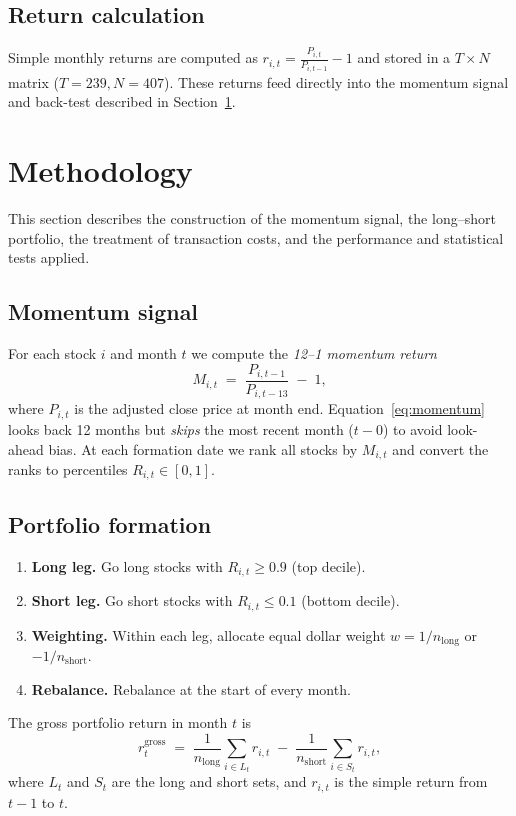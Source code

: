 \documentclass[11pt]{article}
\begin{document}
\subsection{Return calculation}
Simple monthly returns are computed as $r_{i,t} = \frac{P_{i,t}}{P_{i,t-1}}-1$ and stored in a $T \times N$ matrix ($T{=}239, N{=}407$).  
These returns feed directly into the momentum signal and back-test described in Section~\ref{sec:method}.

\section{Methodology} \label{sec:method}
This section describes the construction of the momentum signal, the long–short portfolio, the treatment of transaction costs, and the performance and statistical tests applied.

\subsection{Momentum signal}
For each stock \(i\) and month \(t\) we compute the \emph{12--1 momentum return}
\begin{equation} \label{eq:momentum}
M_{i,t} \;=\; \frac{P_{i,t-1}}{P_{i,t-13}} \;-\; 1,
\end{equation}
where \(P_{i,t}\) is the adjusted close price at month end.  
Equation~\eqref{eq:momentum} looks back 12 months but \emph{skips} the most recent month (\(t-0\)) to avoid look-ahead bias.  
At each formation date we rank all stocks by \(M_{i,t}\) and convert the ranks to percentiles \(R_{i,t}\in[0,1]\).

\subsection{Portfolio formation}
\begin{enumerate}[label=(\alph*), leftmargin=*]
  \item \textbf{Long leg.}   Go long stocks with \(R_{i,t}\ge 0.9\) (top decile).
  \item \textbf{Short leg.}  Go short stocks with \(R_{i,t}\le 0.1\) (bottom decile).
  \item \textbf{Weighting.}  Within each leg, allocate equal dollar weight \(w = 1/n_{\text{long}}\) or \(-1/n_{\text{short}}\).
  \item \textbf{Rebalance.}  Rebalance at the start of every month.
\end{enumerate}

The gross portfolio return in month \(t\) is
\[
r^{\text{gross}}_{t} \;=\; \frac{1}{n_{\text{long}}}\!\sum_{i\in L_t}\! r_{i,t}
\;-\;
\frac{1}{n_{\text{short}}}\!\sum_{i\in S_t}\! r_{i,t},
\]
where \(L_t\) and \(S_t\) are the long and short sets, and \(r_{i,t}\) is the simple return from \(t-1\) to \(t\).
\end{document}
